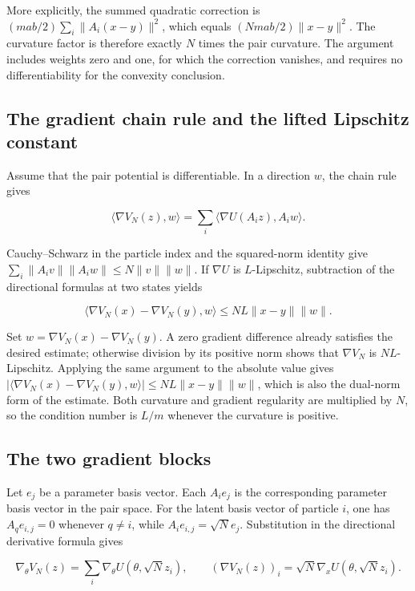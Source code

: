 \documentclass[11pt,a4paper]{article}
\begin{document}
More explicitly, the summed quadratic correction is \((mab/2)\sum_i\|A_i(x-y)\|^2\), which equals \((Nmab/2)\|x-y\|^2\). The curvature factor is therefore exactly \(N\) times the pair curvature. The argument includes weights zero and one, for which the correction vanishes, and requires no differentiability for the convexity conclusion.



\subsection{\texorpdfstring{The gradient chain rule and the lifted Lipschitz constant}{The gradient chain rule and the lifted Lipschitz constant}}


Assume that the pair potential is differentiable. In a direction \(w\), the chain rule gives

\[\langle\nabla V_N(z),w\rangle=\sum_i\langle\nabla U(A_i z),A_iw\rangle.\]

Cauchy–Schwarz in the particle index and the squared-norm identity give \(\sum_i\|A_iv\|\|A_iw\|\le N\|v\|\|w\|\). If \(\nabla U\) is \(L\)-Lipschitz, subtraction of the directional formulas at two states yields

\[\langle\nabla V_N(x)-\nabla V_N(y),w\rangle\le NL\|x-y\|\|w\|.\]

Set \(w=\nabla V_N(x)-\nabla V_N(y)\). A zero gradient difference already satisfies the desired estimate; otherwise division by its positive norm shows that \(\nabla V_N\) is \(NL\)-Lipschitz. Applying the same argument to the absolute value gives \(|\langle\nabla V_N(x)-\nabla V_N(y),w\rangle|\le NL\|x-y\|\|w\|\), which is also the dual-norm form of the estimate. Both curvature and gradient regularity are multiplied by \(N\), so the condition number is \(L/m\) whenever the curvature is positive.




\subsection{\texorpdfstring{The two gradient blocks}{The two gradient blocks}}


Let \(e_j\) be a parameter basis vector. Each \(A_i e_j\) is the corresponding parameter basis vector in the pair space. For the latent basis vector of particle \(i\), one has \(A_qe_{i,j}=0\) whenever \(q\ne i\), while \(A_i e_{i,j}=\sqrt N e_j\). Substitution in the directional derivative formula gives

\[\nabla_\theta V_N(z)=\sum_i\nabla_\theta U(\theta,\sqrt Nz_i),\qquad (\nabla V_N(z))_i=\sqrt N\nabla_xU(\theta,\sqrt Nz_i).\]
\end{document}
